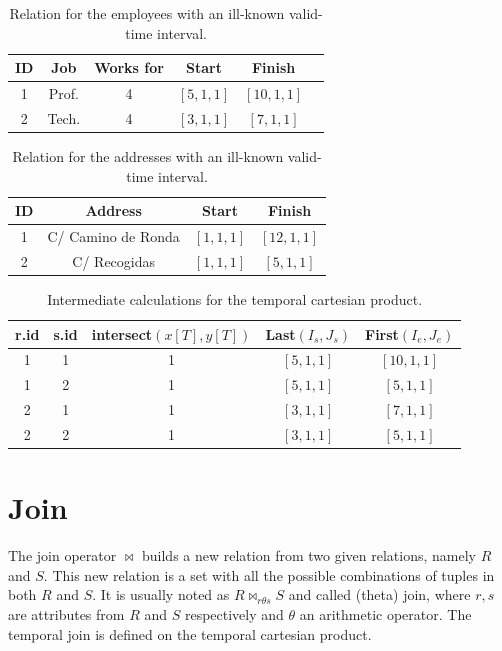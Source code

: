 \documentclass{llncs}
\renewcommand{\Join}{\bowtie}
\begin{document}
\begin{table}
\centering
\caption{Relation for the employees with an ill-known valid-time interval.}
\begin{tabular}{c c c c c c }
\hline
ID & Job & Works for & Start & Finish \\ \hline
1 & Prof. & 4 & $\left[5, 1, 1 \right]$ & $\left[10, 1, 1 \right]$ \\
2 & Tech. & 4 & $\left[3, 1, 1 \right]$ & $\left[7, 1, 1 \right]$ \\
\hline 
\end{tabular}
\label{table:ill-known-employees}
\end{table}

\begin{table}
\centering
\caption{Relation for the addresses with an ill-known valid-time interval.}
\begin{tabular}{c c c c }
\hline
ID & Address & Start & Finish \\ \hline
1 & C/ Camino de Ronda & $\left[1, 1, 1 \right]$ & $\left[12, 1, 1 \right]$ \\
2 & C/ Recogidas &  $\left[1, 1, 1 \right]$ & $\left[5, 1, 1 \right]$ \\
\hline 
\end{tabular}
\label{table:ill-known-addresses}
\end{table}


\begin{table}
\centering
\caption{Intermediate calculations for the temporal cartesian product.}

\begin{tabular}{c c c c c }
\hline
r.id & s.id &  intersect$\left(x\left[T\right], y\left[T\right]\right)$ &  Last$\left( I_s, J_s \right)$ & First$\left(I_e, J_e \right)$  \\ \hline
1 & 1 & 1 & $\left[5, 1, 1 \right]$ & $\left[10, 1, 1 \right]$ \\
1 & 2 & 1 & $\left[5, 1, 1 \right]$ & $\left[5, 1, 1 \right]$ \\
2 & 1 & 1 & $\left[3, 1, 1 \right]$ & $\left[7, 1, 1 \right]$ \\
2 & 2 & 1 & $\left[3, 1, 1 \right]$ & $\left[5, 1, 1 \right]$ \\

\hline 
\end{tabular}
\label{table:example-ik-cartesian-product}
\end{table}

\section{\label{sec:join}Join}
The join operator $\Join$ builds a new relation from two given relations, namely $R$ and $S$. This new relation is a set with all the possible combinations of tuples in both $R$ and $S$. It is usually noted as $R \Join_{r \theta s} S$ and called (theta) join, where $r,s$ are attributes from $R$ and $S$ respectively and $\theta$ an arithmetic operator. The temporal join is defined on the temporal cartesian product.
\end{document}
